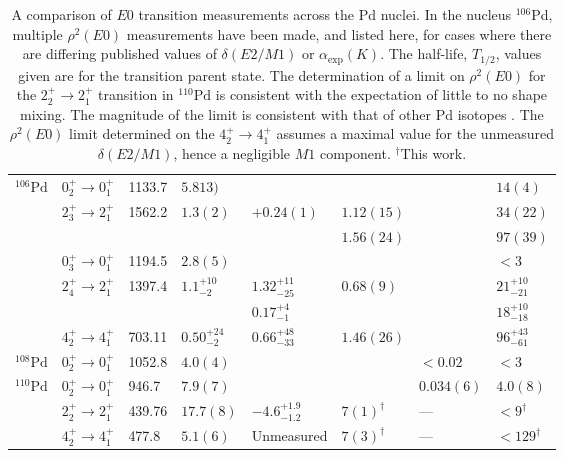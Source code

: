 \begin{sidewaystable}
\begin{center}
\begin{tabular}{|l|l l l l|l l l|}
$^{106}\mathrm{Pd}$&$0_2^+\rightarrow 0_1^+$&1133.7	&$5.813)$ &&&& $14(4)$\\
                   &$2_3^+\rightarrow 2_1^+$&1562.2	&$1.3(2)$  & $+0.24(1)$	&$1.12(15)$	&& $34(22)$\\   
                   &						 &	   	&									&&$1.56(24)$&& $97(39)$\\                   
                   &$0_3^+\rightarrow 0_1^+$&1194.5	&$2.8(5)$    			&& 					 		&& $<3$\\                  
                   &$2_4^+\rightarrow 2_1^+$&1397.4	&$1.1^{+10}_{-2}$					&$1.32^{+11}_{-25}$			&$0.68(9)$ 	&& $21^{+10}_{-21}$\\                   
                   &						&	   	&									&$0.17^{+4}_{-1}$  			&&& $18^{+10}_{-18}$\\                   
                   &$4_2^+\rightarrow 4_1^+$&703.11	&$0.50^{+24}_{-2}$    				&$0.66^{+48}_{-33}$			&$1.46(26)$	&& $96^{+43}_{-61}$\\                   
\hline
$^{108}\mathrm{Pd}$&$0_2^+\rightarrow 0_1^+$&1052.8	&$4.0(4)$    			&&&$<0.02$              	& $<3$\\
\hline 
$^{110}\mathrm{Pd}$&$0_2^+\rightarrow 0_1^+$&946.7 	&$7.9(7)$    			&&&$0.034(6)$ 	& $4.0(8)$  	\\
                   &$2_2^+\rightarrow 2_1^+$&439.76	&$17.7(8)$   			& $-4.6^{+1.9}_{-1.2}$  	& $7(1)^\dagger$  	& --- & $<9^\dagger$\\
                   &$4_2^+\rightarrow 4_1^+$&477.8	&$5.1(6)$    			& Unmeasured            	& $7(3)^\dagger$ & --- & $<129^\dagger$\\
\hline
\end{tabular}
\end{center}
\caption[A comparison of $E0$ transition measurements across the Pd nuclei. New measurements resulting from this work are highlighted.]{A comparison of $E0$ transition measurements across the Pd nuclei. In the nucleus $^{106}$Pd, multiple $\rho^2(E0)$ measurements have been made, and listed here, for cases where there are differing published values of $\delta(E2/M1)$ or $\alpha_\mathrm{exp}(K)$. The half-life, $T_{1/2}$, values given are for the transition parent state. The determination of a limit on $\rho^2(E0)$ for the $2_2^+ \rightarrow 2_1^+$ transition in $^{110}\mathrm{Pd}$ is consistent with the expectation of little to no shape mixing. The magnitude of the limit is consistent with that of other Pd isotopes \cite{Peters2016,Kibedi2005}. The $\rho^2(E0)$ limit determined on the $4^+_2\rightarrow4^+_1$ assumes a maximal value for the unmeasured $\delta(E2/M1)$, hence a negligible $M1$ component. $^\dagger$This work.} 
\label{table: Comparing E0 Strengths of Pd Nuclei}
\end{sidewaystable}

